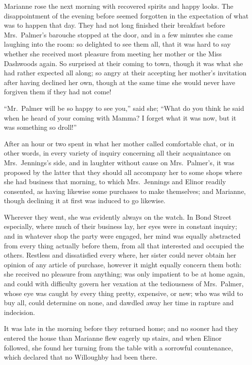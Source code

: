Marianne rose the next morning with recovered spirits
and happy looks.  The disappointment of the evening before
seemed forgotten in the expectation of what was to happen
that day.  They had not long finished their breakfast before
Mrs.\ Palmer's barouche stopped at the door, and in a few
minutes she came laughing into the room: so delighted
to see them all, that it was hard to say whether she
received most pleasure from meeting her mother or the Miss
Dashwoods again.  So surprised at their coming to town,
though it was what she had rather expected all along;
so angry at their accepting her mother's invitation
after having declined her own, though at the same time
she would never have forgiven them if they had not come!

``Mr.\ Palmer will be so happy to see you,''
said she; ``What do you think he said when he heard
of your coming with Mamma?  I forget what it was now,
but it was something so droll!''

After an hour or two spent in what her mother called
comfortable chat, or in other words, in every variety of inquiry
concerning all their acquaintance on Mrs.\ Jennings's side,
and in laughter without cause on Mrs.\ Palmer's, it was
proposed by the latter that they should all accompany
her to some shops where she had business that morning,
to which Mrs.\ Jennings and Elinor readily consented,
as having likewise some purchases to make themselves;
and Marianne, though declining it at first was induced
to go likewise.

Wherever they went, she was evidently always on
the watch.  In Bond Street especially, where much of
their business lay, her eyes were in constant inquiry;
and in whatever shop the party were engaged, her mind was
equally abstracted from every thing actually before them,
from all that interested and occupied the others.
Restless and dissatisfied every where, her sister could
never obtain her opinion of any article of purchase,
however it might equally concern them both: she received
no pleasure from anything; was only impatient to be at
home again, and could with difficulty govern her vexation
at the tediousness of Mrs.\ Palmer, whose eye was caught
by every thing pretty, expensive, or new; who was wild
to buy all, could determine on none, and dawdled away her
time in rapture and indecision.

It was late in the morning before they returned home;
and no sooner had they entered the house than Marianne flew
eagerly up stairs, and when Elinor followed, she found
her turning from the table with a sorrowful countenance,
which declared that no Willoughby had been there.


